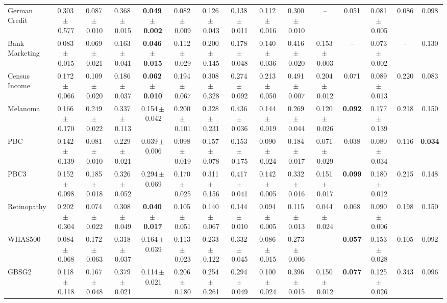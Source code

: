 \documentclass[8pt]{extarticle}
\begin{document}
\begin{longtable}{l*{14}{c}}
German Credit & 0.303\,$\pm$\,0.577 & 0.087\,$\pm$\,0.010 & 0.368\,$\pm$\,0.015 & \textbf{0.049\,$\pm$\,0.002} & 0.082\,$\pm$\,0.009 & 0.126\,$\pm$\,0.043 & 0.138\,$\pm$\,0.011 & 0.112\,$\pm$\,0.016 & 0.300\,$\pm$\,0.010 & -- & 0.051 & 0.081\,$\pm$\,0.005 & 0.086 & 0.098 \\
Bank Marketing & 0.083\,$\pm$\,0.015 & 0.069\,$\pm$\,0.021 & 0.163\,$\pm$\,0.041 & \textbf{0.046\,$\pm$\,0.015} & 0.112\,$\pm$\,0.029 & 0.200\,$\pm$\,0.145 & 0.178\,$\pm$\,0.048 & 0.140\,$\pm$\,0.036 & 0.416\,$\pm$\,0.020 & 0.153\,$\pm$\,0.003 & -- & 0.073\,$\pm$\,0.002 & -- & 0.130 \\
Census Income & 0.172\,$\pm$\,0.066 & 0.109\,$\pm$\,0.020 & 0.186\,$\pm$\,0.037 & \textbf{0.062\,$\pm$\,0.010} & 0.194\,$\pm$\,0.067 & 0.308\,$\pm$\,0.328 & 0.274\,$\pm$\,0.092 & 0.213\,$\pm$\,0.050 & 0.491\,$\pm$\,0.007 & 0.204\,$\pm$\,0.012 & 0.071 & 0.089\,$\pm$\,0.013 & 0.220 & 0.083 \\
Melanoma & 0.166\,$\pm$\,0.170 & 0.249\,$\pm$\,0.022 & 0.337\,$\pm$\,0.113 & 0.154\,$\pm$\,0.042 & 0.200\,$\pm$\,0.101 & 0.328\,$\pm$\,0.231 & 0.436\,$\pm$\,0.036 & 0.144\,$\pm$\,0.019 & 0.269\,$\pm$\,0.044 & 0.120\,$\pm$\,0.026 & \textbf{0.092} & 0.177\,$\pm$\,0.139 & 0.218 & 0.150 \\
PBC & 0.142\,$\pm$\,0.139 & 0.081\,$\pm$\,0.010 & 0.229\,$\pm$\,0.021 & 0.039\,$\pm$\,0.006 & 0.098\,$\pm$\,0.019 & 0.157\,$\pm$\,0.078 & 0.153\,$\pm$\,0.175 & 0.090\,$\pm$\,0.024 & 0.184\,$\pm$\,0.017 & 0.071\,$\pm$\,0.029 & 0.038 & 0.080\,$\pm$\,0.034 & 0.116 & \textbf{0.034} \\
PBC3 & 0.152\,$\pm$\,0.098 & 0.185\,$\pm$\,0.018 & 0.326\,$\pm$\,0.052 & 0.294\,$\pm$\,0.069 & 0.170\,$\pm$\,0.025 & 0.311\,$\pm$\,0.156 & 0.417\,$\pm$\,0.041 & 0.142\,$\pm$\,0.005 & 0.332\,$\pm$\,0.016 & 0.151\,$\pm$\,0.017 & \textbf{0.099} & 0.180\,$\pm$\,0.012 & 0.215 & 0.148 \\
Retinopathy & 0.202\,$\pm$\,0.304 & 0.074\,$\pm$\,0.022 & 0.308\,$\pm$\,0.049 & \textbf{0.040\,$\pm$\,0.017} & 0.105\,$\pm$\,0.051 & 0.140\,$\pm$\,0.067 & 0.144\,$\pm$\,0.010 & 0.094\,$\pm$\,0.005 & 0.115\,$\pm$\,0.013 & 0.044\,$\pm$\,0.024 & 0.068 & 0.090\,$\pm$\,0.006 & 0.198 & 0.150 \\
WHAS500 & 0.084\,$\pm$\,0.068 & 0.172\,$\pm$\,0.063 & 0.318\,$\pm$\,0.037 & 0.164\,$\pm$\,0.039 & 0.113\,$\pm$\,0.023 & 0.233\,$\pm$\,0.122 & 0.332\,$\pm$\,0.045 & 0.086\,$\pm$\,0.015 & 0.273\,$\pm$\,0.006 & -- & \textbf{0.057} & 0.153\,$\pm$\,0.028 & 0.105 & 0.092 \\
GBSG2 & 0.118\,$\pm$\,0.118 & 0.167\,$\pm$\,0.048 & 0.379\,$\pm$\,0.021 & 0.114\,$\pm$\,0.021 & 0.206\,$\pm$\,0.180 & 0.254\,$\pm$\,0.261 & 0.294\,$\pm$\,0.049 & 0.100\,$\pm$\,0.024 & 0.396\,$\pm$\,0.015 & 0.150\,$\pm$\,0.012 & \textbf{0.077} & 0.125\,$\pm$\,0.026 & 0.343 & 0.096 \\

\end{longtable}
\end{document}
